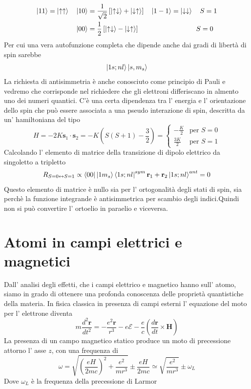 \documentclass[11pt,a4paper]{article}
\theoremstyle{springer}
\theoremstyle{definition}
\theoremstyle{remark}
\begin{document}
\begin{align*}
  \ket{11} = \ket{\uparrow\uparrow} \quad \ket{10} &= \frac{1}{\sqrt{2}}\left[\ket{\uparrow \downarrow}+ \ket{\downarrow \uparrow}\right] \quad \ket{1-1} = \ket{\downarrow\downarrow} \quad S = 1 \\
  \ket{00} &= \frac{1}{2}\left[\ket{\uparrow\downarrow}-\ket{\downarrow\uparrow}\right] \quad \quad \quad\quad \quad\quad\quad\quad\,\, S = 0
\end{align*}
Per cui una vera autofunzione completa che dipende anche dai gradi di libertà di spin sarebbe
\begin{equation*}
  \ket{1s;nl}\ket{s,m_s}
\end{equation*}
La richiesta di antisimmetria è anche conosciuto come principio di Pauli e vedremo che corrisponde nel richiedere che gli elettroni differiscano in almento uno dei numeri quantici. C'è una certa dipendenza tra l' energia e l' orientazione dello spin che può essere associata a una pseudo interazione di spin, descritta da un' hamiltoniana del tipo
\begin{equation*}
  H = -2K \mathbf{s}_1\cdot\mathbf{s}_2 = -K \left(S(S+1)-\frac{3}{2}\right) = 
  \begin{cases}
    -\frac{K}{2} & \text{per } S=0\\
    \frac{3K}{2} & \text{per }S = 1
  \end{cases}
\end{equation*}
Calcolando l' elemento di matrice della transizione di dipolo elettrico da singoletto a tripletto 
\begin{equation*}
  R_{S=0 \leftrightarrow S = 1} \propto \bra{00}\ket{1m_s} \bra{1s;nl}^{sym} \mathbf{r}_1+\mathbf{r}_2 \ket{1s;nl}^{ant} = 0
\end{equation*}
Questo elemento di matrice è nullo sia per l' ortogonalità degli stati di spin, sia perchè la funzione integrande è antisimmetrica per scambio degli indici.Quindi non si può convertire l' ortoelio in paraelio e viceversa.


\section{Atomi in campi elettrici e magnetici}
Dall' analisi degli effetti, che i campi elettrico e magnetico hanno sull' atomo, siamo in grado di ottenere una profonda conoscenza delle proprietà quantistiche della materia. In fisica classica in presenza di campi esterni l' equazione del moto per l' elettrone diventa
\begin{equation*}
  m \frac{d^2\mathbf{r}}{dt^2} = -\frac{e^2\mathbf{r}}{r^3}-e \mathbf{\mathcal{E}}-\frac{e}{c}\left(\frac{d\mathbf{r}}{dt} \times \mathbf{H}\right)
\end{equation*}
La presenza di un campo magnetico statico produce un moto di precessione attorno l' asse $z$, con una frequenza di 
\begin{equation*}
  \omega = \sqrt{\left(\frac{eH}{2mc}\right)^2+\frac{e^2}{mr^3}}\pm \frac{eH}{2mc} \simeq \sqrt{\frac{e^2}{mr^3}} \pm \omega_L
\end{equation*}
Dove $\omega_L$ è la frequenza della precessione di Larmor
\end{document}
